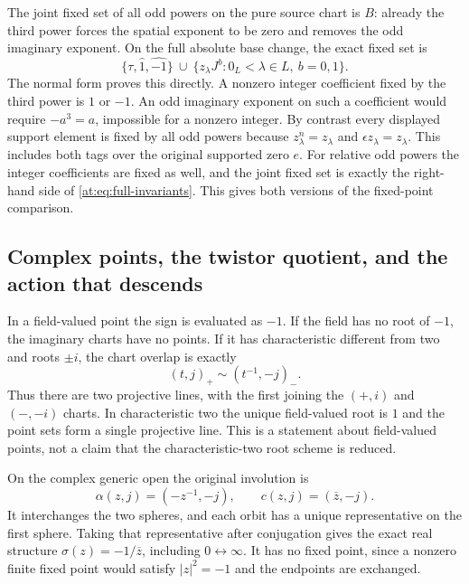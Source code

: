 The joint fixed set of all odd powers on the pure source chart is
$B$: already the third power forces the spatial exponent to be
zero and removes the odd imaginary exponent. On the full
absolute base change, the exact fixed set is
\[
 \{\tau,\widehat1,\widehat{-1}\}
 \ \cup\ \{z_\lambda J^b:0_L<\lambda\in L,\ b=0,1\}.
 \tag{AT20}\label{at:eq:full-power-fixed}
\]
The normal form proves this directly. A nonzero integer coefficient
fixed by the third power is $1$ or $-1$. An odd imaginary exponent
on such a coefficient would require $-a^3=a$, impossible for a
nonzero integer. By contrast every displayed support element is
fixed by all odd powers because $z_\lambda^n=z_\lambda$ and
$\epsilon z_\lambda=z_\lambda$. This includes both tags over
the original supported zero $e$.
For relative odd powers the integer coefficients are fixed as
well, and the joint fixed set is exactly the right-hand side of
\eqref{at:eq:full-invariants}. This gives both versions of the
fixed-point comparison.

\subsection{Complex points, the twistor quotient, and the action that descends}

In a field-valued point the sign is evaluated as $-1$. If the field
has no root of $-1$, the imaginary charts have no points. If it
has characteristic different from two and roots $\pm i$, the
chart overlap is exactly
\[
 (t,j)_+\sim(t^{-1},-j)_-.
 \tag{AT21}\label{at:eq:point-overlap}
\]
Thus there are two projective lines, with the first joining the
$(+,i)$ and $(-,-i)$ charts. In characteristic two the unique
field-valued root is $1$ and the point sets form a single
projective line. This is a statement about field-valued points,
not a claim that the characteristic-two root scheme is reduced.

On the complex generic open the original involution is
\[
 \alpha(z,j)=(-z^{-1},-j),\qquad
 c(z,j)=(\overline z,-j).
 \tag{AT22}\label{at:eq:point-involutions}
\]
It interchanges the two spheres, and each orbit has a unique
representative on the first sphere. Taking that representative
after conjugation gives the exact real structure
$\sigma(z)=-1/\overline z$, including $0\leftrightarrow\infty$.
It has no fixed point, since a nonzero finite fixed point would
satisfy $|z|^2=-1$ and the endpoints are exchanged.

